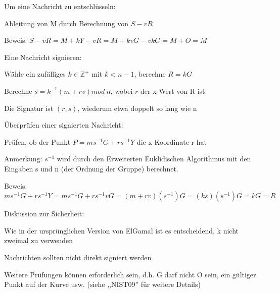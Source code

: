 \documentclass[a4paper]{article}
\begin{document}
\begin{multicols}{3}
\begin{itemize*}
\begin{itemize*}
            \end{itemize*}
            \item Um eine Nachricht zu entschlüsseln:
            \begin{itemize*}
                  \item Ableitung von M durch Berechnung von $S-vR$
                  \item Beweis: $S-vR=M+kY-vR =M+kvG-vkG= M+O= M$
            \end{itemize*}
            \item Eine Nachricht signieren:
            \begin{itemize*}
                  \item Wähle ein zufälliges $k\in\mathbb{Z}^+$ mit $k< n-1$, berechne $R = kG$
                  \item Berechne $s=k^{-1}(m+rv) mod\ n$, wobei $r$ der x-Wert von R ist
                  \item Die Signatur ist $(r,s)$, wiederum etwa doppelt so lang wie n
            \end{itemize*}
            \item Überprüfen einer signierten Nachricht:
            \begin{itemize*}
                  \item Prüfen, ob der Punkt $P=ms^{-1}G+rs^{-1}Y$ die x-Koordinate r hat
                  \item Anmerkung: $s^{-1}$ wird durch den Erweiterten Euklidischen Algorithmus mit den Eingaben s und n (der Ordnung der Gruppe) berechnet.
                  \item Beweis: $ms^{-1}G+rs^{-1}Y = ms^{-1}G+rs^{-1}vG = (m+rv)(s^{-1})G = (ks)(s^{-1})G = kG = R$
            \end{itemize*}
            \item Diskussion zur Sicherheit:
            \begin{itemize*}
                  \item Wie in der ursprünglichen Version von ElGamal ist es entscheidend, k nicht zweimal zu verwenden
                  \item Nachrichten sollten nicht direkt signiert werden
                  \item Weitere Prüfungen können erforderlich sein, d.h. G darf nicht O sein, ein gültiger Punkt auf der Kurve usw. (siehe ,,NIST09'' für weitere Details)
            \end{itemize*}
      \end{itemize*}


\end{multicols}
\end{document}
